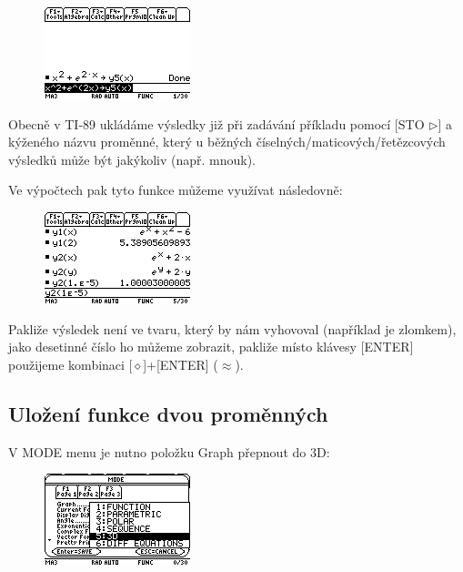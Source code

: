 \documentclass[10pt,a4paper,float]{article}
\begin{document}
\begin{figure}[H]
	\centering
	\includegraphics[width=.5\textwidth]{img/1FUNC_ULOZ}
\end{figure}

Obecně v TI-89 ukládáme výsledky již při zadávání příkladu pomocí [STO $\triangleright$] a kýženého názvu proměnné, který u běžných číselných/maticových/řetězcových výsledků může být jakýkoliv (např. mnouk).

Ve výpočtech pak tyto funkce můžeme využívat následovně:

\begin{figure}[H]
	\centering
	\includegraphics[width=.5\textwidth]{img/1FUNC_UZITI}
\end{figure}

Pakliže výsledek není ve tvaru, který by nám vyhovoval (například je zlomkem), jako desetinné číslo ho můžeme zobrazit, pakliže místo klávesy [ENTER] použijeme kombinaci [$\diamond$]+[ENTER] ($\approx$).

\pagebreak

\subsection{Uložení funkce dvou proměnných}
\label{ssec:ulozeni2fce}
V MODE menu je nutno položku Graph přepnout do 3D:

\begin{figure}[H]
	\centering
	\includegraphics[width=.5\textwidth]{img/3D}
\end{figure}
\end{document}
